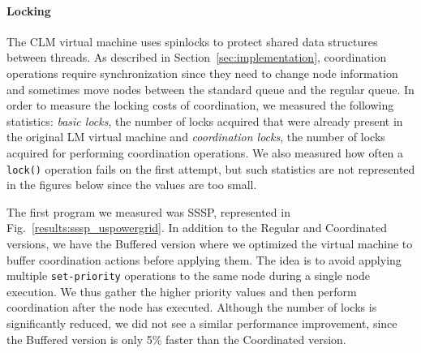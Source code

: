 \paragraph{Locking} The CLM virtual machine uses spinlocks to protect shared data structures between
threads. As described in Section~\ref{sec:implementation}, coordination
operations require synchronization since they need to change node information
and sometimes move nodes between the standard queue and the regular queue.
In order to measure the locking costs of coordination, we measured the following
statistics: \emph{basic locks}, the number of locks acquired that were already
present in the original LM virtual machine and \emph{coordination locks}, the
number of locks acquired for performing coordination operations. We also
measured how often a \texttt{lock()} operation fails on the first attempt, but
such statistics are not represented in the figures below since the values are
too small.

The first program we measured was SSSP, represented in
Fig.~\ref{results:sssp_uspowergrid}. In addition to the Regular and
Coordinated versions, we have the Buffered version where we
optimized the virtual machine to buffer coordination actions before applying
them. The idea is to avoid applying multiple \texttt{set-priority} operations to
the same node during a single node execution. We thus gather the higher priority
values and then perform coordination after the node has executed.
Although the number of locks is significantly reduced, we did not see a
similar performance improvement, since the Buffered version is only
5\% faster than the Coordinated version.

\begin{topfig}
   \begin{center}
   \end{center}
\end{topfig}

